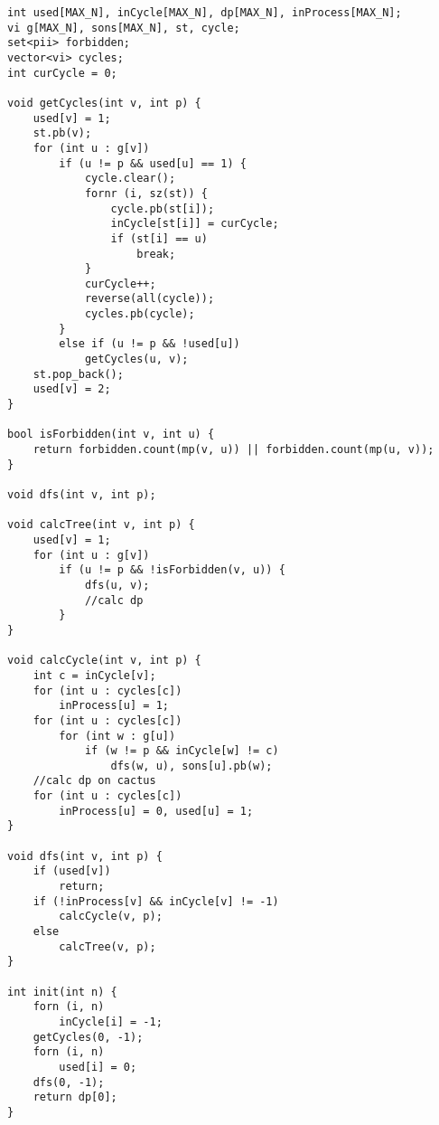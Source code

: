 \begin{verbatim}
int used[MAX_N], inCycle[MAX_N], dp[MAX_N], inProcess[MAX_N];
vi g[MAX_N], sons[MAX_N], st, cycle;
set<pii> forbidden;
vector<vi> cycles;
int curCycle = 0;

void getCycles(int v, int p) {
	used[v] = 1;
	st.pb(v);
	for (int u : g[v])
		if (u != p && used[u] == 1) {
			cycle.clear();
			fornr (i, sz(st)) {
				cycle.pb(st[i]);
				inCycle[st[i]] = curCycle;
				if (st[i] == u)
					break;
			}		
			curCycle++;
			reverse(all(cycle));
			cycles.pb(cycle);
		}
		else if (u != p && !used[u])
			getCycles(u, v);
	st.pop_back();
	used[v] = 2;
}

bool isForbidden(int v, int u) {
	return forbidden.count(mp(v, u)) || forbidden.count(mp(u, v));
}

void dfs(int v, int p);

void calcTree(int v, int p) {
	used[v] = 1;
	for (int u : g[v])
		if (u != p && !isForbidden(v, u)) {
			dfs(u, v);
			//calc dp
		}
}

void calcCycle(int v, int p) {
	int c = inCycle[v];
	for (int u : cycles[c])
		inProcess[u] = 1;
	for (int u : cycles[c])
		for (int w : g[u])
			if (w != p && inCycle[w] != c)
				dfs(w, u), sons[u].pb(w);
	//calc dp on cactus
	for (int u : cycles[c])
		inProcess[u] = 0, used[u] = 1;
}

void dfs(int v, int p) {
	if (used[v])
		return;
	if (!inProcess[v] && inCycle[v] != -1) 
		calcCycle(v, p);
	else
		calcTree(v, p);
}	

int init(int n) {
	forn (i, n)
		inCycle[i] = -1;
	getCycles(0, -1);
	forn (i, n)
		used[i] = 0;
	dfs(0, -1);
	return dp[0];
}
\end{verbatim}
